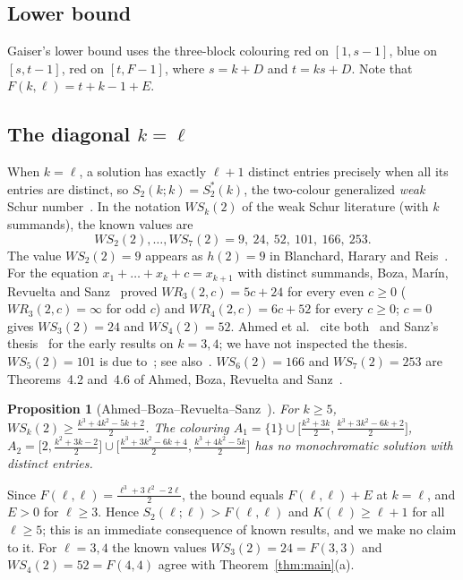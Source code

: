 \documentclass[11pt]{amsart}
\newtheorem{proposition}[theorem]{Proposition}
\theoremstyle{definition}
\newcommand{\F}{F}
\newcommand{\Stwo}{S_2}
\begin{document}
\subsection*{Lower bound} Gaiser's lower bound uses the three-block colouring red on $[1,s-1]$, blue on $[s,t-1]$, red on $[t,\F-1]$, where $s=k+D$ and $t=ks+D$. Note that $\F(k,\ell)=t+k-1+E$.

\subsection*{The diagonal $k=\ell$} When $k=\ell$, a solution has exactly $\ell+1$ distinct entries precisely when all its entries are distinct, so $\Stwo(k;k)=S_2^*(k)$, the two-colour generalized \emph{weak} Schur number~\cite{Gaiser}. In the notation $WS_k(2)$ of the weak Schur literature (with $k$ summands), the known values are
\[
WS_2(2),\dots,WS_7(2)=9,\ 24,\ 52,\ 101,\ 166,\ 253.
\]
The value $WS_2(2)=9$ appears as $h(2)=9$ in Blanchard, Harary and Reis~\cite{BHR}. For the equation $x_1+\dots+x_k+c=x_{k+1}$ with distinct summands, Boza, Mar\'in, Revuelta and Sanz~\cite{BMRS} proved $WR_3(2,c)=5c+24$ for every even $c\ge0$ ($WR_3(2,c)=\infty$ for odd $c$) and $WR_4(2,c)=6c+52$ for every $c\ge0$; $c=0$ gives $WS_3(2)=24$ and $WS_4(2)=52$. Ahmed et al.~\cite{ABRS} cite both~\cite{BMRS} and Sanz's thesis~\cite{Sanz} for the early results on $k=3,4$; we have not inspected the thesis. $WS_5(2)=101$ is due to~\cite{BMRS}; see also~\cite{BRS}. $WS_6(2)=166$ and $WS_7(2)=253$ are Theorems~4.2 and~4.6 of Ahmed, Boza, Revuelta and Sanz~\cite{ABRS}.

\begin{proposition}[Ahmed--Boza--Revuelta--Sanz~{\cite[Lemma~2.1]{ABRS}}]\label{prop:ahmed}
For $k\ge5$, $WS_k(2)\ge\frac{k^3+4k^2-5k+2}{2}$. The colouring $A_1=\{1\}\cup\bigl[\tfrac{k^2+3k}{2},\tfrac{k^3+3k^2-6k+2}{2}\bigr]$, $A_2=\bigl[2,\tfrac{k^2+3k-2}{2}\bigr]\cup\bigl[\tfrac{k^3+3k^2-6k+4}{2},\tfrac{k^3+4k^2-5k}{2}\bigr]$ has no monochromatic solution with distinct entries.
\end{proposition}

\noindent Since $\F(\ell,\ell)=\frac{\ell^3+3\ell^2-2\ell}{2}$, the bound equals $\F(\ell,\ell)+E$ at $k=\ell$, and $E>0$ for $\ell\ge3$. Hence $\Stwo(\ell;\ell)>\F(\ell,\ell)$ and $K(\ell)\ge\ell+1$ for all $\ell\ge5$; this is an immediate consequence of known results, and we make no claim to it. For $\ell=3,4$ the known values $WS_3(2)=24=\F(3,3)$ and $WS_4(2)=52=\F(4,4)$ agree with Theorem~\ref{thm:main}(a).
\end{document}
